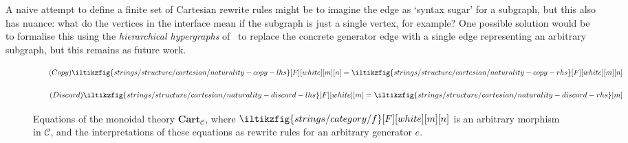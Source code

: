 \begin{remark}
    A naive attempt to define a finite set of Cartesian rewrite rules might be
    to imagine the edge as `syntax sugar' for a subgraph, but this also has
    nuance: what do the vertices in the interface mean if the subgraph is just a
    single vertex, for example?
    One possible solution would be to formalise this using the
    \emph{hierarchical hypergraphs} of~\cite{alvarez-picallo2022rewriting} to
    replace the concrete generator edge with a single edge representing an
    arbitrary subgraph, but this remains as future work.
\end{remark}


\begin{figure}
    \centering
    \begin{minipage}{0.45\textwidth}
        \begin{equation}
            \tag{\(\mathsf{Copy}\)}
            \iltikzfig{strings/structure/cartesian/naturality-copy-lhs}[F][white][m][n]
            =
            \iltikzfig{strings/structure/cartesian/naturality-copy-rhs}[F][white][m][n]
            \label{eq:cartesian-copy}
        \end{equation}
    \end{minipage}
    \qquad
    \begin{minipage}{0.4\textwidth}
        \centering
        \begin{equation}
            \tag{\(\mathsf{Discard}\)}
            \iltikzfig{strings/structure/cartesian/naturality-discard-lhs}[F][white][m]
            =
            \iltikzfig{strings/structure/cartesian/naturality-discard-rhs}[m]
            \label{eq:cartesian-discard}
        \end{equation}
    \end{minipage}

    \begin{minipage}{0.45\textwidth}
        \begin{center}
            
        \end{center}
    \end{minipage}
    \begin{minipage}{0.4\textwidth}
        \begin{center}
            
        \end{center}
    \end{minipage}

    \caption{
        Equations of the monoidal theory \(\mathbf{Cart}_\mathcal{C}\),
        where \(\iltikzfig{strings/category/f}[F][white][m][n]\) is an arbitrary
        morphism in \(\mathcal{C}\), and the interpretations of these equations
        as rewrite rules for an arbitrary generator \(e\).
    }
    \label{fig:cartesian-equations}
\end{figure}